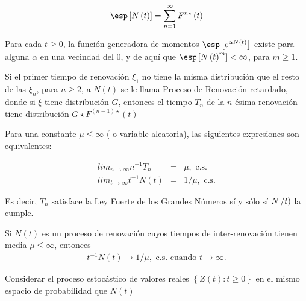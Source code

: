 \begin{eqnarray*}
\esp\left[N\left(t\right)\right]=\sum_{n=1}^{\infty}F^{n\star}\left(t\right)
\end{eqnarray*}

\begin{Prop}
Para cada $t\geq0$, la funci\'on generadora de momentos $\esp\left[e^{\alpha N\left(t\right)}\right]$ existe para alguna $\alpha$ en una vecindad del 0, y de aqu\'i que $\esp\left[N\left(t\right)^{m}\right]<\infty$, para $m\geq1$.
\end{Prop}


\begin{Note}
Si el primer tiempo de renovaci\'on $\xi_{1}$ no tiene la misma distribuci\'on que el resto de las $\xi_{n}$, para $n\geq2$, a $N\left(t\right)$ se le llama Proceso de Renovaci\'on retardado, donde si $\xi$ tiene distribuci\'on $G$, entonces el tiempo $T_{n}$ de la $n$-\'esima renovaci\'on tiene distribuci\'on $G\star F^{\left(n-1\right)\star}\left(t\right)$
\end{Note}


\begin{Teo}
Para una constante $\mu\leq\infty$ ( o variable aleatoria), las siguientes expresiones son equivalentes:

\begin{eqnarray}
lim_{n\rightarrow\infty}n^{-1}T_{n}&=&\mu,\textrm{ c.s.}\\
lim_{t\rightarrow\infty}t^{-1}N\left(t\right)&=&1/\mu,\textrm{ c.s.}
\end{eqnarray}
\end{Teo}


Es decir, $T_{n}$ satisface la Ley Fuerte de los Grandes N\'umeros s\'i y s\'olo s\'i $N\left/t\right)$ la cumple.


\begin{Coro}
Si $N\left(t\right)$ es un proceso de renovaci\'on cuyos tiempos de inter-renovaci\'on tienen media $\mu\leq\infty$, entonces
\begin{eqnarray}
t^{-1}N\left(t\right)\rightarrow 1/\mu,\textrm{ c.s. cuando }t\rightarrow\infty.
\end{eqnarray}

\end{Coro}


Considerar el proceso estoc\'astico de valores reales $\left\{Z\left(t\right):t\geq0\right\}$ en el mismo espacio de probabilidad que $N\left(t\right)$

